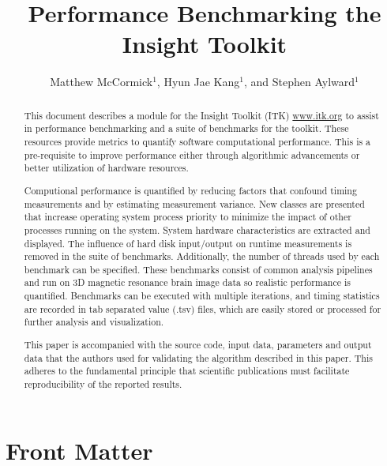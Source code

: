 \documentclass{InsightArticle}
\title{Performance Benchmarking the Insight Toolkit}
\author{Matthew McCormick$^{1}$, Hyun Jae Kang$^{1}$, and Stephen Aylward$^{1}$}
\newcommand{\IJhandlerIDnumber}{1338}
\begin{document}
%
%
\IJhandlefooter{\IJhandlerIDnumber}


\ifpdf
\else
\fi


\maketitle


\ifhtml
\chapter*{Front Matter\label{front}}
\fi

\begin{abstract} \noindent This document describes a module for the Insight
Toolkit (ITK) \url{www.itk.org} to assist in performance benchmarking and a
suite of benchmarks for the toolkit. These resources provide metrics to
quantify software computational performance. This is a pre-requisite to
improve performance either through algorithmic advancements or better
utilization of hardware resources.

Computional performance is quantified by reducing factors that confound timing
measurements and by estimating measurement variance. New classes are presented
that increase operating system process priority to minimize the impact of
other processes running on the system. System hardware characteristics are
extracted and displayed. The influence of hard disk input/output on runtime
measurements is removed in the suite of benchmarks. Additionally, the number
of threads used by each benchmark can be specified. These benchmarks consist
of common analysis pipelines and run on 3D magnetic resonance brain image data
so realistic performance is quantified. Benchmarks can be executed with
multiple iterations, and timing statistics are recorded in tab separated value
(.tsv) files, which are easily stored or processed for further analysis and
visualization.

This paper is accompanied with the source code, input data, parameters and
output data that the authors used for validating the algorithm described in
this paper. This adheres to the fundamental principle that scientific
publications must facilitate reproducibility of the reported results.

\end{abstract}
\end{document}
